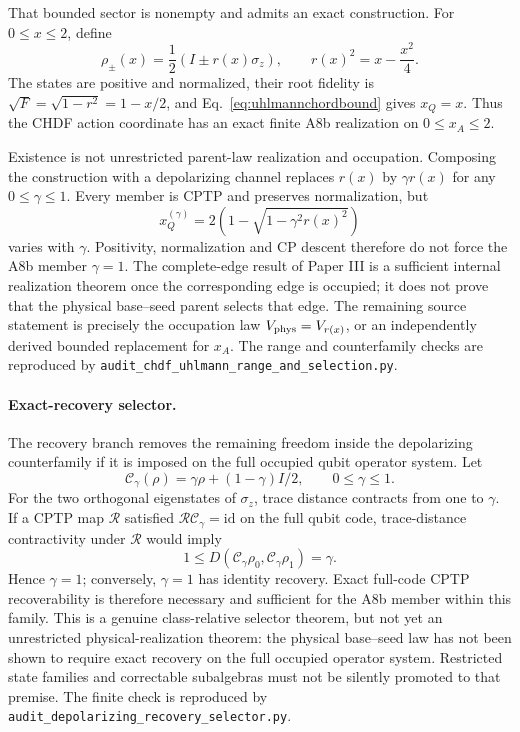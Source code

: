 That bounded sector is nonempty and admits an exact construction. For
$0\leq x\leq2$, define
\begin{equation}
 \rho_\pm(x)=\frac12\left(I\pm r(x)\sigma_z\right),\qquad
 r(x)^2=x-\frac{x^2}{4}.
 \label{eq:a8bmixedrealization}
\end{equation}
The states are positive and normalized, their root fidelity is
$\sqrt{F}=\sqrt{1-r^2}=1-x/2$, and Eq.~\eqref{eq:uhlmannchordbound} gives
$x_Q=x$. Thus the CHDF action coordinate has an exact finite A8b realization
on $0\leq x_A\leq2$.

Existence is not unrestricted parent-law realization and occupation. Composing the construction with a
depolarizing channel replaces $r(x)$ by $\gamma r(x)$ for any
$0\leq\gamma\leq1$. Every member is CPTP and preserves normalization, but
\begin{equation}
 x_Q^{(\gamma)}=2\left(1-\sqrt{1-\gamma^2r(x)^2}\right)
 \label{eq:a8bdepolarizingfamily}
\end{equation}
varies with $\gamma$. Positivity, normalization and CP descent therefore do
not force the A8b member $\gamma=1$. The complete-edge result of Paper III is
a sufficient internal realization theorem once the corresponding edge is
occupied; it does not prove that the physical base--seed parent selects that
edge. The remaining source statement is precisely the occupation law
$V_{\rm phys}=V_{r(x)}$, or an independently derived bounded replacement for
$x_A$. The range and counterfamily checks are reproduced by
\texttt{audit\_chdf\_uhlmann\_range\_and\_selection.py}.

\paragraph{Exact-recovery selector.}
The recovery branch removes the remaining freedom inside the depolarizing
counterfamily if it is imposed on the full occupied qubit operator system.
Let
\begin{equation}
 \mathcal C_\gamma(\rho)=\gamma\rho+(1-\gamma)I/2,
 \qquad 0\leq\gamma\leq1.
 \label{eq:depolarizingselector}
\end{equation}
For the two orthogonal eigenstates of $\sigma_z$, trace distance contracts
from one to $\gamma$. If a CPTP map $\mathcal R$ satisfied
$\mathcal R\mathcal C_\gamma=\mathrm{id}$ on the full qubit code, trace-distance
contractivity under $\mathcal R$ would imply
\begin{equation}
 1\leq D(\mathcal C_\gamma\rho_0,\mathcal C_\gamma\rho_1)=\gamma.
\end{equation}
Hence $\gamma=1$; conversely, $\gamma=1$ has identity recovery. Exact
full-code CPTP recoverability is therefore necessary and sufficient for the
A8b member within this family. This is a genuine class-relative selector
theorem, but not yet an unrestricted physical-realization theorem: the
physical base--seed law has not been shown to require exact recovery on the
full occupied operator system. Restricted state
families and correctable subalgebras must not be silently promoted to that
premise. The finite check is reproduced by
\texttt{audit\_depolarizing\_recovery\_selector.py}.

